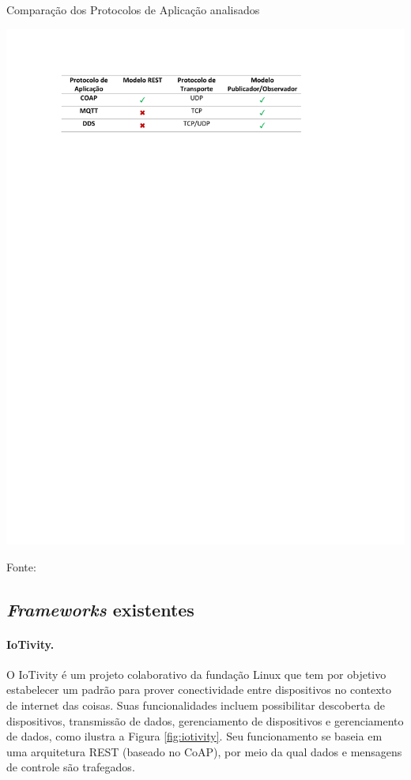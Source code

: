 \begin{table}[h]
	\centering
	\caption{Comparação dos Protocolos de Aplicação analisados}\smallskip
	\label{tab:comp_prot_aplic}
	\includegraphics[width=\textwidth]{tabelas/comp_prot_aplic.pdf}
	
	Fonte: \cite{Fuqaha2015}
\end{table}

\subsection{\textit{Frameworks} existentes}
\paragraph*{IoTivity.} O IoTivity \cite{iotivity} é um projeto colaborativo da fundação Linux que tem por objetivo estabelecer um padrão para prover conectividade entre dispositivos no contexto de internet das coisas. Suas funcionalidades incluem possibilitar descoberta de dispositivos, transmissão de dados, gerenciamento de dispositivos e gerenciamento de dados, como ilustra a Figura \ref{fig:iotivity}. Seu funcionamento se baseia em uma arquitetura REST (baseado no CoAP), por meio da qual dados e mensagens de controle são trafegados. 


